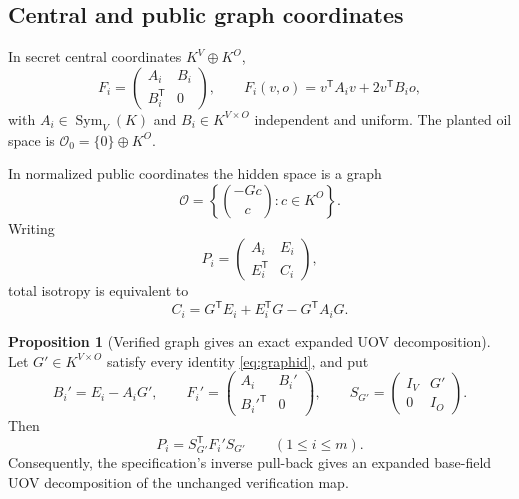\documentclass[11pt,a4paper]{article}
\theoremstyle{definition}
\newtheorem{proposition}[theorem]{Proposition}
\theoremstyle{remark}
\newcommand{\cO}{\mathcal O}
\newcommand{\Sym}{\operatorname{Sym}}
\newcommand{\trans}{\mathsf T}
\begin{document}
\subsection{Central and public graph coordinates}

In secret central coordinates $K^V\oplus K^O$,
\begin{equation}\label{eq:central}
F_i=\begin{pmatrix}A_i&B_i\\B_i^{\trans}&0\end{pmatrix},
\qquad F_i(v,o)=v^{\trans}A_iv+2v^{\trans}B_io,
\end{equation}
with $A_i\in\Sym_V(K)$ and $B_i\in K^{V\times O}$ independent and uniform.  The planted oil space is $\cO_0=\{0\}\oplus K^O$.

In normalized public coordinates the hidden space is a graph
\begin{equation}\label{eq:graph}
\cO=\left\{\binom{-Gc}{c}:c\in K^O\right\}.
\end{equation}
Writing
\[
P_i=\begin{pmatrix}A_i&E_i\\E_i^{\trans}&C_i\end{pmatrix},
\]
total isotropy is equivalent to
\begin{equation}\label{eq:graphid}
C_i=G^{\trans}E_i+E_i^{\trans}G-G^{\trans}A_iG.
\end{equation}

\begin{proposition}[Verified graph gives an exact expanded UOV decomposition]\label{prop:verified-key}
Let $G'\in K^{V\times O}$ satisfy every identity \eqref{eq:graphid}, and put
\[
B_i'=E_i-A_iG',\qquad
F_i'=\begin{pmatrix}A_i&B_i'\\ {B_i'}^{\trans}&0\end{pmatrix},\qquad
S_{G'}=\begin{pmatrix}I_V&G'\\0&I_O\end{pmatrix}.
\]
Then
\[
P_i=S_{G'}^{\trans}F_i'S_{G'}
\qquad(1\le i\le m).
\]
Consequently, the specification's inverse pull-back gives an expanded base-field UOV decomposition of the unchanged verification map.
\end{proposition}
\end{document}
